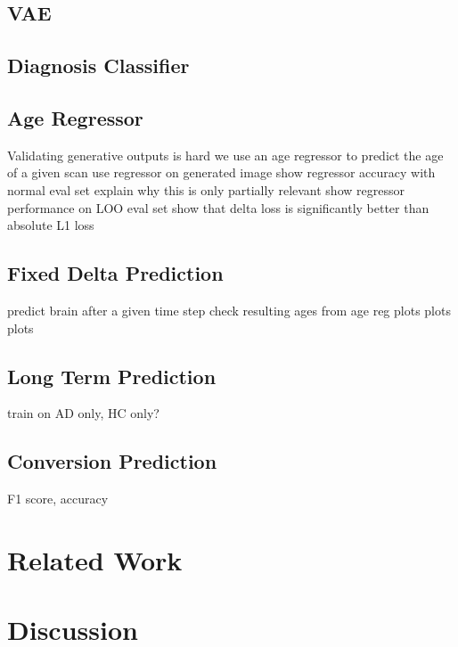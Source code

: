 \section{VAE}

\section{Diagnosis Classifier}

\section{Age Regressor}
Validating generative outputs is hard
we use an age regressor to predict the age of a given scan
use regressor on generated image
show regressor accuracy with normal eval set
explain why this is only partially relevant
show regressor performance on LOO eval set
show that delta loss is significantly better than absolute L1 loss

\section{Fixed Delta Prediction}
predict brain after a given time step
check resulting ages from age reg
plots plots plots

\section{Long Term Prediction}
train on AD only, HC only?

\section{Conversion Prediction}
F1 score, accuracy

\chapter{Related Work}

\chapter{Discussion}
